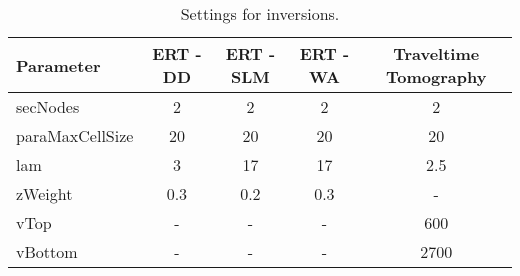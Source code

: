 \begin{table}[H]
\centering
\caption{Settings for inversions.}
\begin{tabular}{lcccc}
\hline
Parameter       & ERT - DD & ERT - SLM & ERT - WA & Traveltime Tomography \\ \hline
secNodes        & 2                   & 2                  & 2            & 2                     \\
paraMaxCellSize & 20                  & 20                 & 20           & 20                    \\
lam             & 3                   & 17                 & 17           & 2.5                    \\
zWeight         & 0.3                 & 0.2                & 0.3          & -                     \\
vTop            & -                   & -                  & -            & 600                   \\
vBottom         & -                   & -                  & -            & 2700                  \\ \hline
\end{tabular}
\label{table:settings_inv}
\end{table}